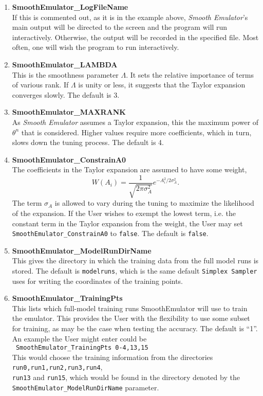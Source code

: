 \documentclass[UserManual.tex]{subfiles}
\begin{document}
\begin{enumerate}\itemsep 0pt
\item {\bf SmoothEmulator\_LogFileName}\\
If this is commented out, as it is in the example above, {\it Smooth Emulator}'s main output will be directed to the screen and the program will run interactively. Otherwise, the output will be recorded in the specified file. Most often, one will wish the program to run interactively.

\item {\bf SmoothEmulator\_LAMBDA}\\
This is the smoothness parameter $\Lambda$. It sets the relative importance of terms of various rank. If $\Lambda$ is unity or less, it suggests that the Taylor expansion converges slowly. The default is 3.

\item {\bf SmoothEmulator\_MAXRANK}\\
As {\it Smooth Emulator} assumes a Taylor expansion, this the maximum power of $\theta^n$ that is considered. Higher values require more coefficients, which in turn, slows down the tuning process. The default is 4.

\item {\bf SmoothEmulator\_ConstrainA0}\\
The coefficients in the Taylor expansion are assumed to have some weight,
\[
W(A_i)=\frac{1}{\sqrt{2\pi\sigma_A^2}}e^{-A_i^2/2\sigma_A^2}.
\]
The term $\sigma_A$ is allowed to vary during the tuning to maximize the likelihood of the expansion. If the User wishes to exempt the lowest term, i.e. the constant term in the Taylor expansion from the weight, the User may set {\tt SmoothEmulator\_ConstrainA0} to {\tt false}. The default is {\tt false}.

\item {\bf SmoothEmulator\_ModelRunDirName}\\
This gives the directory in which the training data from the full model runs is stored. The default is {\tt modelruns}, which is the same default {\tt Simplex Sampler} uses for writing the coordinates of the training points.

\item {\bf SmoothEmulator\_TrainingPts}\\
This lists which full-model training runs SmoothEmulator will use to train the emulator. This provides the User with the flexibility to use some subset for training, as may be the case when testing the accuracy. The default is ``1''. An example the User might enter could be\\
{\tt ~SmoothEmulator\_TrainingPts  0-4,13,15}\\
This would choose the training information from the directories {\tt run0,run1,run2,run3,run4},\\{\tt run13} and {\tt run15}, which would be found in the directory denoted by the\\{\tt SmoothEmulator\_ModelRunDirName} parameter.


\end{enumerate}
\end{document}
